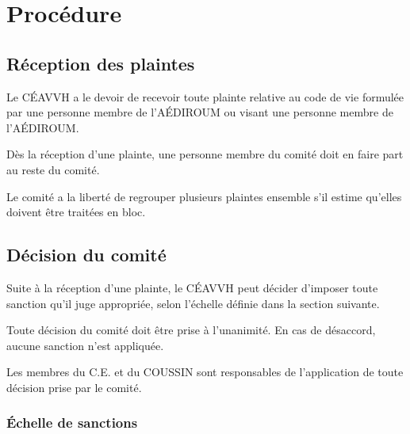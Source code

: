 \documentclass{aediroum}
\begin{document}
\section{Procédure}

\subsection{Réception des plaintes}

Le CÉAVVH a le devoir de recevoir toute plainte relative au code de vie formulée par une personne membre de l’AÉDIROUM ou visant une personne membre de l’AÉDIROUM.

Dès la réception d’une plainte, une personne membre du comité doit en faire part au reste du comité.

Le comité a la liberté de regrouper plusieurs plaintes ensemble s’il estime qu’elles doivent être traitées en bloc.

\subsection{Décision du comité}

Suite à la réception d’une plainte, le CÉAVVH peut décider d’imposer toute sanction qu’il juge appropriée, selon l’échelle définie dans la section suivante.

Toute décision du comité doit être prise à l’unanimité. En cas de désaccord, aucune sanction n’est appliquée.

Les membres du C.E. et du COUSSIN sont responsables de l’application de toute décision prise par le comité.

\subsubsection{Échelle de sanctions}
\end{document}
